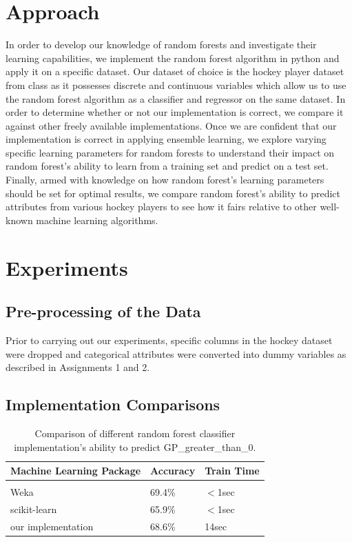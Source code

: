 \documentclass{article} %
\begin{document}
\section{Approach}

In order to develop our knowledge of random forests and investigate their learning capabilities, we implement the random forest algorithm in python and apply it on a specific dataset.  Our dataset of choice is the hockey player dataset from class as it possesses discrete and continuous variables which allow us to use the random forest algorithm as a classifier and regressor on the same dataset.  In order to determine whether or not our implementation is correct, we compare it against other freely available implementations.  Once we are confident that our implementation is correct in applying ensemble learning, we explore varying specific learning parameters for random forests to understand their impact on random forest's ability to learn from a training set and predict on a test set.  Finally, armed with knowledge on how random forest's learning parameters should be set for optimal results, we compare random forest's ability to predict attributes from various hockey players to see how it fairs relative to other well-known machine learning algorithms.


\section{Experiments}

\subsection{Pre-processing of the Data}
Prior to carrying out our experiments, specific columns in the hockey dataset were dropped and categorical attributes were converted into dummy variables as described in Assignments 1 and 2.

\subsection{Implementation Comparisons}

\begin{table}[h]
\caption{Comparison of different random forest classifier implementation's ability to predict GP\_greater\_than\_0.}
\label{clas-table}
\begin{center}
\begin{tabular}{lll}
\multicolumn{1}{c}{\bf Machine Learning Package} &\multicolumn{1}{c}{\bf Accuracy} &\multicolumn{1}{c}{\bf Train Time}
\\ \hline \\
Weka         &69.4\%	&$<$1sec \\
scikit-learn             &65.9\%	&$<$1sec \\
our implementation             &68.6\%	&14sec \\
\end{tabular}
\end{center}
\end{table}
\end{document}
